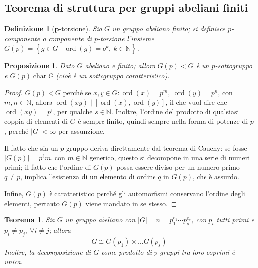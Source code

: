\documentclass[11pt]{article}
\theoremstyle{style}
\newtheorem{definizione}{Definizione}[section]
\newtheorem{prop}{Proposizione}[section]
\newtheorem{teorema}{Teorema}[section]
\numberwithin{equation}{subsection}
\begin{document}
\subsection{Teorema di struttura per gruppi abeliani finiti}
\begin{definizione}
	[$\mathbf{p}$-torsione]
Sia $G$ un gruppo abeliano finito; si definisce \textit{$p$-componente} o \textit{componente di $p$-torsione} l'insieme $G(p) = \left\{ g \in  G  \mid \operatorname{ord}(g) =p^k, \ k \in \mathbb{N} \right\} $.
\end{definizione}
\begin{prop}
	Dato $G$ abeliano e finito; allora $G(p) < G$ \`e un $p$-sottogruppo e $G(p) \operatorname{char} G$ (cio\`e \`e un sottogruppo caratteristico).
\end{prop}
	\begin{proof}
		$G(p) < G$ perch\'e se $x,y \in G : \operatorname{ord}(x) =p^m,\  \operatorname{ord}(y) =p^n$, con $m,n \in \mathbb{N}$, allora $\operatorname{ord}(xy)  \mid [\operatorname{ord}(x) , \operatorname{ord}(y) ]$, il che vuol dire che $\operatorname{ord}(xy) = p^s$, per qualche $s \in  \mathbb{N}$.
		Inoltre, l'ordine del prodotto di qualsiasi coppia di elementi di $G$ \`e sempre finito, quindi sempre nella forma di potenze di $p$, perch\'e $\lvert G \rvert < \infty$ per assunzione.

		Il fatto che sia un $p$-gruppo deriva direttamente dal teorema di Cauchy: se fosse $\lvert G(p) \rvert = p^\ell m $, con $m \in \mathbb{N}$ generico, questo si decompone in una serie di numeri primi; il fatto che l'ordine di $G(p)$ possa essere diviso per un numero primo $q\neq p$, implica l'esistenza di un elemento di ordine $q$ in $G(p)$, che \`e assurdo.

		Infine, $G(p)$ \`e caratteristico perch\'e gli automorfismi conservano l'ordine degli elementi, pertanto $G(p)$ viene mandato in se stesso.
	\end{proof}
\begin{teorema}\label{corts1}
	Sia $G$ un gruppo abeliano con $\lvert G \rvert = n = p_1^{e_1} \cdots p_s^{e_s}$, con $p_i$ tutti primi e $p_i\neq p_j, \ \forall i\neq j$; allora
	\[
	G \cong G(p_1) \times \ldots G(p_s)
	\] 
	Inoltre, la decomposizione di $G$ come prodotto di $p$-gruppi tra loro coprimi \`e unica.
\end{teorema}
\end{document}
